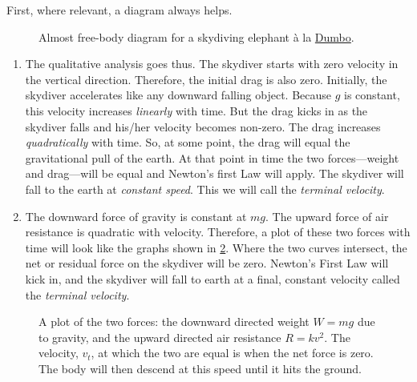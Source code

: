 \documentclass[
  a4paper,
]{article}
\begin{document}
First, where relevant, a diagram always helps.

\begin{figure}
\centering

\caption[Almost free-body diagram for a skydiving elephant à la
\href{https://en.wikipedia.org/wiki/Dumbo}{Dumbo}.]{Almost free-body
diagram\footnotemark{} for a skydiving elephant à la
\href{https://en.wikipedia.org/wiki/Dumbo}{Dumbo}.}\label{fig:skydiver}
\end{figure}

\begin{enumerate}
\def\labelenumi{(\alph{enumi})}
\item
  The qualitative analysis goes thus. The skydiver starts with zero
  velocity in the vertical direction. Therefore, the initial drag is
  also zero. Initially, the skydiver accelerates like any downward
  falling object. Because \(g\) is constant, this velocity increases
  \emph{linearly} with time. But the drag kicks in as the skydiver falls
  and his/her velocity becomes non-zero. The drag increases
  \emph{quadratically} with time. So, at some point, the drag will equal
  the gravitational pull of the earth. At that point in time the two
  forces---weight and drag---will be equal and Newton's first Law will
  apply. The skydiver will fall to the earth at \emph{constant speed}.
  This we will call the \emph{terminal velocity}.
\item
  The downward force of gravity is constant at \(mg\). The upward force
  of air resistance is quadratic with velocity. Therefore, a plot of
  these two forces with time will look like the graphs shown in
  \cref{fig:terminal-velocity}. Where the two curves intersect, the net
  or residual force on the skydiver will be zero. Newton's First Law
  will kick in, and the skydiver will fall to earth at a final, constant
  velocity called the \emph{terminal velocity}.
\end{enumerate}

\begin{figure}
\centering

\caption{A plot of the two forces: the downward directed weight
\(W = mg\) due to gravity, and the upward directed air resistance
\(R = kv^2\). The velocity, \(v_t\), at which the two are equal is when
the net force is zero. The body will then descend at this speed until it
hits the ground.}\label{fig:terminal-velocity}
\end{figure}
\end{document}
